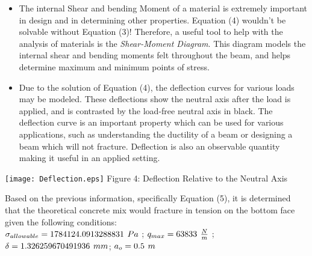 \documentclass[landscape,a0paper,fontscale=0.335]{baposter} %
\begin{document}
\begin{poster}
{\begin{multicols}{2}
\columnbreak 
 
\begin{itemize}
\item The internal Shear and bending Moment of a material is extremely important in design and in determining other properties. Equation (4) wouldn't be solvable without Equation (3)! Therefore, a useful tool to help with the analysis of materials is the \textit{Shear-Moment Diagram}. This diagram models the internal shear and bending moments felt throughout the beam, and helps determine maximum and minimum points of stress.
\end{itemize}

\end{multicols}

\begin{multicols}{2}

\begin{itemize}
\item Due to the solution of Equation (4), the deflection curves for various loads may be modeled. These deflections show the neutral axis after the load is applied, and is contrasted by the load-free neutral axis in black. The deflection curve is an important property which can be used for various applications, such as understanding the ductility of a beam or designing a beam which will not fracture. Deflection is also an observable quantity making it useful in an applied setting.
\end{itemize}

\columnbreak

\begin{center}
\texttt{[image: Deflection.eps]}
\scriptsize{
Figure 4: Deflection Relative to the Neutral Axis
}
\end{center}

\end{multicols}



Based on the previous information, specifically Equation (5), it is determined that the theoretical concrete mix would fracture in tension on the bottom face given the following conditions:\\

\center $\sigma_{allowable} = 1784124.0913288831 \hspace{0.055in} Pa$  ;\hspace{0.45in} $q_{max} = 63833 \hspace{0.055in} \frac{N}{m}$  ;\hspace{0.45in}  $\delta = 1.326259670491936 \hspace{0.055in} mm$;   \hspace{0.45in}    $a_o = 0.5\hspace{0.055in} m$

}
\end{poster}
\end{document}
